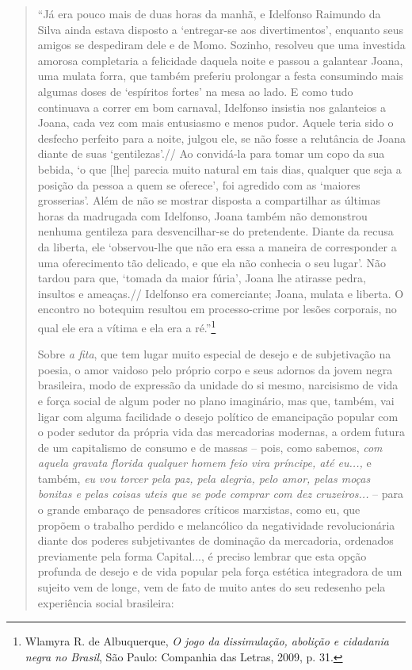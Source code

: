 \begin{quote}
``Já era pouco mais de duas horas da manhã, e Idelfonso Raimundo da
Silva ainda estava disposto a `entregar-se aos divertimentos', enquanto
seus amigos se despediram dele e de Momo. Sozinho, resolveu que uma
investida amorosa completaria a felicidade daquela noite e passou a
galantear Joana, uma mulata forra, que também preferiu prolongar a festa
consumindo mais algumas doses de `espíritos fortes' na mesa ao lado. E
como tudo continuava a correr em bom carnaval, Idelfonso insistia nos
galanteios a Joana, cada vez com mais entusiasmo e menos pudor. Aquele
teria sido o desfecho perfeito para a noite, julgou ele, se não fosse a
relutância de Joana diante de suas `gentilezas'.// Ao convidá-la para
tomar um copo da sua bebida, `o que {[}lhe{]} parecia muito natural em
tais dias, qualquer que seja a posição da pessoa a quem se oferece', foi
agredido com as `maiores grosserias'. Além de não se mostrar disposta a
compartilhar as últimas horas da madrugada com Idelfonso, Joana também
não demonstrou nenhuma gentileza para desvencilhar-se do pretendente.
Diante da recusa da liberta, ele `observou-lhe que não era essa a
maneira de corresponder a uma oferecimento tão delicado, e que ela não
conhecia o seu lugar'. Não tardou para que, `tomada da maior fúria',
Joana lhe atirasse pedra, insultos e ameaças.// Idelfonso era
comerciante; Joana, mulata e liberta. O encontro no botequim resultou em
processo-crime por lesões corporais, no qual ele era a vítima e ela era
a ré.''\footnote{Wlamyra R. de Albuquerque, \emph{O jogo da
  dissimulação, abolição e cidadania negra no Brasil}, São Paulo:
  Companhia das Letras, 2009, p. 31.}

Sobre \emph{a fita}, que tem lugar muito especial de desejo e de
subjetivação na poesia, o amor vaidoso pelo próprio corpo e seus adornos
da jovem negra brasileira, modo de expressão da unidade do si mesmo,
narcisismo de vida e força social de algum poder no plano imaginário,
mas que, também, vai ligar com alguma facilidade o desejo político de
emancipação popular com o poder sedutor da própria vida das mercadorias
modernas, a ordem futura de um capitalismo de consumo e de massas --
pois, como sabemos, \emph{com aquela gravata florida qualquer homem feio
vira príncipe, até eu...,} e também, \emph{eu vou torcer pela paz, pela
alegria, pelo amor, pelas moças bonitas e pelas coisas uteis que se pode
comprar com dez cruzeiros...} -- para o grande embaraço de pensadores
críticos marxistas, como eu, que propõem o trabalho perdido e
melancólico da negatividade revolucionária diante dos poderes
subjetivantes de dominação da mercadoria, ordenados previamente pela
forma Capital..., é preciso lembrar que esta opção profunda de desejo e
de vida popular pela força estética integradora de um sujeito vem de
longe, vem de fato de muito antes do seu redesenho pela experiência
social brasileira:


\end{quote}
